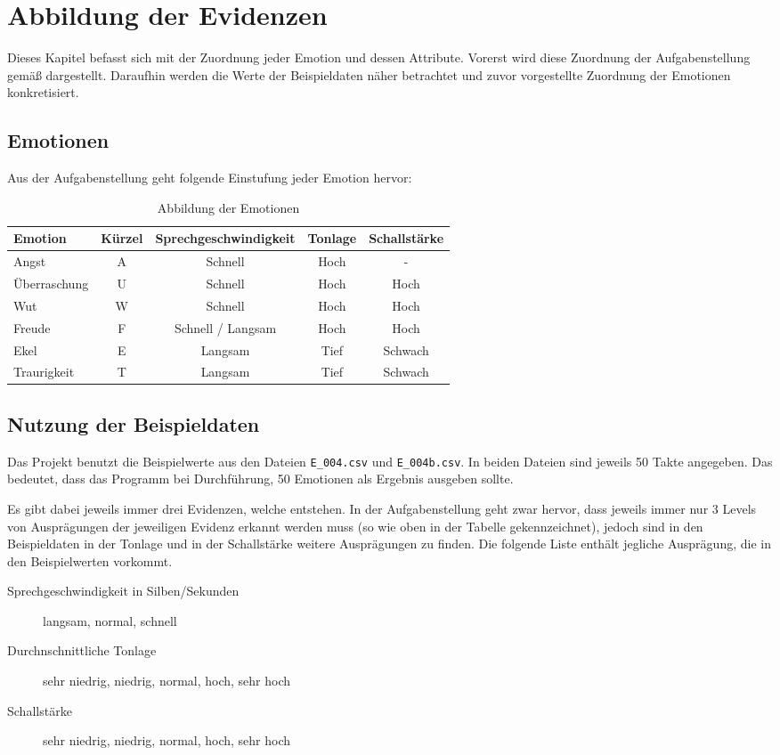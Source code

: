 \chapter{Abbildung der Evidenzen}
Dieses Kapitel befasst sich mit der Zuordnung jeder Emotion und dessen Attribute. Vorerst wird diese Zuordnung der Aufgabenstellung gemäß dargestellt. Daraufhin werden die Werte der Beispieldaten näher betrachtet und zuvor vorgestellte Zuordnung der Emotionen konkretisiert. 

\section{Emotionen}

Aus der Aufgabenstellung geht folgende Einstufung jeder Emotion hervor:

\begin{table}[h]
\begin{tabular}{ l | c | c | c | c}
  Emotion & Kürzel & Sprechgeschwindigkeit & Tonlage & Schallstärke \\
  \hline 
  Angst & A & Schnell & Hoch & - \\
  Überraschung & U & Schnell & Hoch & Hoch \\
  Wut & W & Schnell & Hoch & Hoch \\
  Freude & F & Schnell / Langsam & Hoch & Hoch \\
  Ekel & E & Langsam & Tief & Schwach \\
  Traurigkeit & T & Langsam & Tief & Schwach \\
\end{tabular}
\caption{Abbildung der Emotionen}
\label{tab:emotionenAbbildung}
\end{table}

\section{Nutzung der Beispieldaten}
Das Projekt benutzt die Beispielwerte aus den Dateien \verb|E_004.csv| und \verb|E_004b.csv|. In beiden Dateien sind jeweils 50 Takte angegeben. Das bedeutet, dass das Programm bei Durchführung, 50 Emotionen als Ergebnis ausgeben sollte.


Es gibt dabei jeweils immer drei Evidenzen, welche entstehen. In der Aufgabenstellung geht zwar hervor, dass jeweils immer nur 3 Levels von Ausprägungen der jeweiligen Evidenz erkannt werden muss (so wie oben in der Tabelle gekennzeichnet), jedoch sind in den Beispieldaten in der Tonlage und in der Schallstärke weitere Ausprägungen zu finden. Die folgende Liste enthält jegliche Ausprägung, die in den Beispielwerten vorkommt. 
\begin{description}
  \item [Sprechgeschwindigkeit in Silben/Sekunden] langsam, normal, schnell
  \item [Durchnschnittliche Tonlage] sehr niedrig, niedrig, normal, hoch, sehr hoch
  \item [Schallstärke] sehr niedrig, niedrig, normal, hoch, sehr hoch
\end{description}

